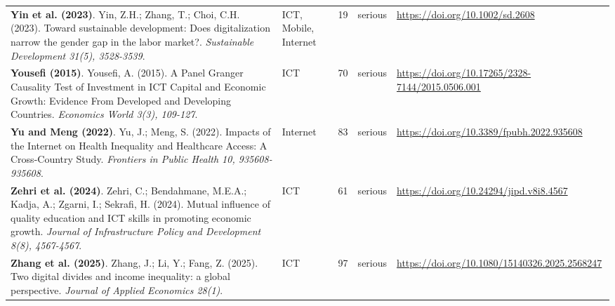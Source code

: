 {\begin{longtable}{@{}p{7.4cm} p{1.3cm} r l p{3.4cm}@{}}
\textbf{Yin et al. (2023)}. Yin, Z.H.; Zhang, T.; Choi, C.H. (2023). Toward sustainable development: Does digitalization narrow the gender gap in the labor market?. \emph{Sustainable Development 31(5), 3528-3539}. & ICT, Mobile, Internet & 19 & serious & \url{https://doi.org/10.1002/sd.2608} \\
\textbf{Yousefi (2015)}. Yousefi, A. (2015). A Panel Granger Causality Test of Investment in ICT Capital and Economic Growth: Evidence From Developed and Developing Countries. \emph{Economics World 3(3), 109-127}. & ICT & 70 & serious & \url{https://doi.org/10.17265/2328-7144/2015.0506.001} \\
\textbf{Yu and Meng (2022)}. Yu, J.; Meng, S. (2022). Impacts of the Internet on Health Inequality and Healthcare Access: A Cross-Country Study. \emph{Frontiers in Public Health 10, 935608-935608}. & Internet & 83 & serious & \url{https://doi.org/10.3389/fpubh.2022.935608} \\
\textbf{Zehri et al. (2024)}. Zehri, C.; Bendahmane, M.E.A.; Kadja, A.; Zgarni, I.; Sekrafi, H. (2024). Mutual influence of quality education and ICT skills in promoting economic growth. \emph{Journal of Infrastructure Policy and Development 8(8), 4567-4567}. & ICT & 61 & serious & \url{https://doi.org/10.24294/jipd.v8i8.4567} \\
\textbf{Zhang et al. (2025)}. Zhang, J.; Li, Y.; Fang, Z. (2025). Two digital divides and income inequality: a global perspective. \emph{Journal of Applied Economics 28(1)}. & ICT & 97 & serious & \url{https://doi.org/10.1080/15140326.2025.2568247} \\
\end{longtable}
}

